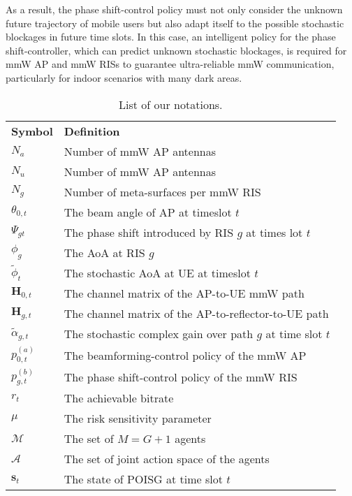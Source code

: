 \documentclass[conference]{IEEEtran}
\begin{document}
As a result, the phase shift-control policy must not only consider the unknown future trajectory of mobile users but also adapt itself to the possible stochastic blockages in future time slots. In this case, an intelligent policy for the phase shift-controller, which can predict unknown stochastic blockages, is required for mmW AP and mmW RISs to guarantee ultra-reliable mmW communication, particularly for indoor scenarios with many dark areas.
\begin{table}[t]
\caption{List of our notations.}
\small
\vspace{-.5cm}
\begin{center}
\begin{tabular}{l | l } \toprule
{ \textbf{Symbol}}  & { \textbf{Definition}}   \\  \rowcolor[gray]{.9} \hline
$N_a$   &  Number of mmW AP antennas\\
$N_u$   &  Number of mmW AP antennas\\ \rowcolor[gray]{.9}
$N_g$   & Number of meta-surfaces per mmW RIS\\
$\theta_{0,t}$  & The beam angle of AP at timeslot $t$\\ \rowcolor[gray]{.9}
$\Psi_{gt}$ & The phase shift introduced by RIS $g$ at times lot $t$\\
$\phi_{g}$  & The AoA at RIS $g$\\ \rowcolor[gray]{.9}
$\tilde{\phi}_{t}$  & The stochastic AoA at UE at timeslot $t$\\
$\boldsymbol{H}_{0,t}$  & The channel matrix of the AP-to-UE mmW path\\ \rowcolor[gray]{.9}
$\boldsymbol{H}_{g,t}$   & The channel matrix of the AP-to-reflector-to-UE path\\
$\tilde{\alpha}_{g,t}$ & The stochastic complex gain over path $g$ at time slot $t$\\ \rowcolor[gray]{.9}
$p_{0,t}^{(a)}$ & The beamforming-control policy of the mmW AP\\
$p_{g,t}^{(b)}$   & The phase shift-control policy of the mmW RIS\\ \rowcolor[gray]{.9}
$r_t$ & The achievable bitrate \\
$\mu$   & The risk sensitivity parameter\\ \rowcolor[gray]{.9}
$\mathcal{M}$ & The set of $M=G+1$ agents \\
$\mathcal{A}$   & The set of joint action space of the agents\\ \rowcolor[gray]{.9}
$\boldsymbol{s}_t$ & The state of POISG at time slot $t$ \\

\end{tabular}
\end{center}
\end{table}
\end{document}
